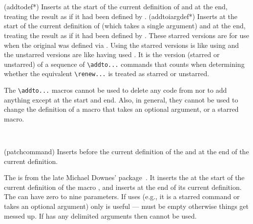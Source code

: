 \begin{syntax}
\cmd{\addtodef*} \\
\cmd{\addtoiargdef*} \\
\end{syntax}
\glossary(addtodef*)%
  {}%
  {Inserts  at the start of the current definition of 
    and  at the end, treating the result as if it had
   been defined by .}
\glossary(addtoiargdef*)%
  {}%
  {Inserts  at the start of the current definition of 
    (which takes a single argument) and  at the 
   end, treating the result as if it had been defined by .}
These starred versions are for use when the original 
was defined via \cmd{\newcommand*}. Using the starred versions is
like using \cmd{\renewcommand*} and the unstarred versions are like
having used \cmd{\renewcommand}. It is the version (starred or unstarred)
of a sequence of \verb?\addto...? commands that counts when determining whether
the equivalent \verb?\renew...? is treated as starred or unstarred.

    The \verb?\addto...? macros cannot be used to delete any code from 
 nor to add anything except at the start and end. Also,
in general, they cannot be used to change the definition of a macro that
takes an optional argument, or a starred macro.

\begin{syntax}
\cmd{\patchcommand} \\
\end{syntax}
\glossary(patchcommand)%
  {}%
  {Inserts  before the current definition of the 
    and  at the end of the current definition.}%

The \cmd{\patchcommand} is from the late 
Michael Downes'
 package~\cite{PATCHCMD}. 
It inserts the  at 
the start of the current definition of the macro ,
and inserts  at the end of its current definition.
The  can have zero to nine parameters. If 
uses \cmd{\futurelet} (e.g., it is a starred command or takes an
optional argument) only  is useful --- 
 must be empty otherwise things get messed up. If
 has any delimited arguments then \cmd{\patchcommand}
cannot be used.


